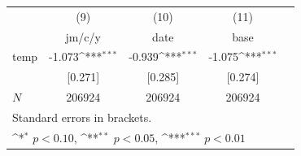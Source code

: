 \documentclass[11pt]{article}
\begin{document}
\begin{subappendices}
\begin{center}
			
				{
					\def\sym#1{\ifmmode^{#1}\else\(^{#1}\)\fi}
					\begin{tabular}{l*{4}{c}}
						\hline\hline
						& \multicolumn{1}{c}{(9)}&\multicolumn{1}{c}{(10)}&\multicolumn{1}{c}{(11)}\\
						& \multicolumn{1}{c}{jm/c/y}&\multicolumn{1}{c}{date}&\multicolumn{1}{c}{base}\\
						\hline
						temp  &  -1.073\sym{***}&      -0.939\sym{***}&      -1.075\sym{***}\\
 						&     [0.271]         &     [0.285]         &     [0.274]         \\
						\hline
						\(N\)      &      206924         &      206924         &      206924         \\
						\hline\hline
						\multicolumn{4}{l}{\footnotesize Standard errors in brackets.}\\
						\multicolumn{4}{l}{\footnotesize \sym{*} \(p<0.10\), \sym{**} \(p<0.05\), \sym{***} \(p<0.01\)}\\
					\end{tabular}
				}			
			
		\end{center}
		

\end{subappendices}
\end{document}
